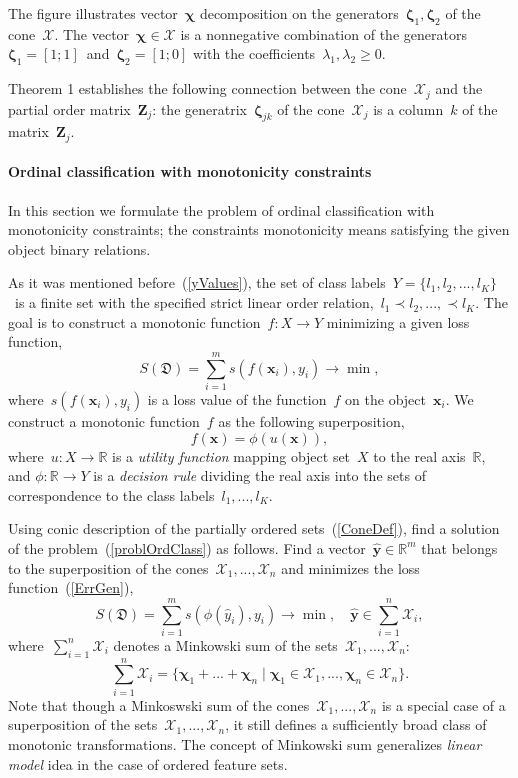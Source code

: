 \documentclass[12pt,preprint]{elsarticle}
\newcommand{\bx}{\mathbf{x}}
\newcommand{\by}{\mathbf{y}}
\newcommand{\bZ}{\mathbf{Z}}
\newcommand{\bchi}{\boldsymbol{\chi}}
\newcommand{\bzeta}{\boldsymbol{\zeta}}
\begin{document}
The figure illustrates vector~$\bchi$ decomposition on the generators~$\bzeta_1,\bzeta_2$ of the cone~$\mathcal{X}$. The vector~$\bchi\in \mathcal{X}$ is a nonnegative combination of the generators~$\bzeta_1=[1;1]$~and~$\bzeta_2=[1;0]$ with the coefficients~$\lambda_1,\lambda_2\geq 0$.

Theorem 1 establishes the following connection between the cone~$\mathcal{X}_j$ and the partial order matrix~$\bZ_j$: the generatrix~$\bzeta_{jk}$ of the cone~$\mathcal{X}_j$ is a column~$k$ of the matrix~$\bZ_j$.

\paragraph{Ordinal classification with monotonicity constraints}
In this section we formulate the problem of ordinal classification with monotonicity constraints; the constraints monotonicity means satisfying the given object binary relations.

As it was mentioned before~(\ref{yValues}), the set of class labels~$Y=\{l_1,l_2,...,l_K\}$~is a finite set with the specified strict linear order relation,~$l_1\prec l_2,...,\prec l_K$. The goal is to construct a monotonic function~$f:X\rightarrow Y$ minimizing a given loss function,
\begin{equation}
S(\mathfrak{D})=\sum\limits_{i=1}^m{s(f(\bx_i), y_i)}\rightarrow \min,
\label{ErrGen}
\end{equation}
where~$s(f(\bx_i), y_i)$ is a loss value of the function~$f$ on the object~$\bx_i$.
We construct a monotonic function~$f$ as the following superposition,
\begin{equation}
f(\bx)=\phi(u(\bx)),
\label{problOrdClass}
\end{equation}
where~$u:X\rightarrow \mathbb{R}$ is a \emph{utility function} mapping object set~$X$ to the real axis~$\mathbb{R}$, and $\phi:\mathbb{R}\rightarrow Y$ is a \emph{decision rule} dividing the real axis into the sets of correspondence to the class labels~$l_1,...,l_K$.

Using conic description of the partially ordered sets~(\ref{ConeDef}), find a solution of the problem~(\ref{problOrdClass}) as follows. Find a vector~$\hat{\by}\in \mathbb{R}^m$ that belongs to the superposition of the cones~$\mathcal{X}_1,...,\mathcal{X}_n$ and minimizes the loss function~(\ref{ErrGen}),
\[
S(\mathfrak{D})=\sum\limits_{i=1}^m{s(\phi(\hat{y}_i), y_i)}\rightarrow \min,\quad \hat{\by}\in \sum\limits_{i=1}^n\mathcal{X}_i,
\]
where~$\sum\limits_{i=1}^n\mathcal{X}_i$ denotes a Minkowski sum of the sets~$\mathcal{X}_1,...,\mathcal{X}_n$:
\[
\sum\limits_{i=1}^n\mathcal{X}_i=\{\bchi_1+...+\bchi_n\;|\;\bchi_1\in\mathcal{X}_1,...,\bchi_n\in\mathcal{X}_n\}.
\]
Note that though a Minkoswski sum of the cones~$\mathcal{X}_1,...,\mathcal{X}_n$ is a special case of a superposition of the sets~$\mathcal{X}_1,...,\mathcal{X}_n$, it still defines a sufficiently broad class of monotonic transformations. The concept of Minkowski sum generalizes \emph{linear model} idea in the case of ordered feature sets.
\end{document}
